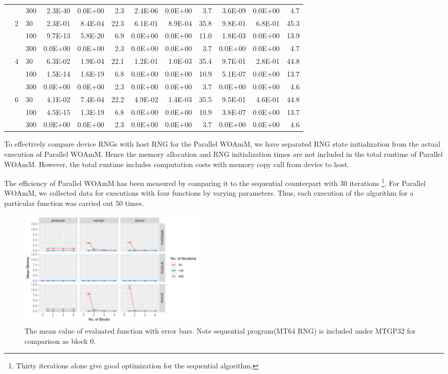 \documentclass[conference]{IEEEtran}
\begin{document}
\begin{table}[!t]
\begin{tabular}{|l|l|l|rrr|rrr|rrr|}
      & & 300  & 2.3E-40 & 0.0E+00 & 2.3 & 2.4E-06 & 0.0E+00 & 3.7 & 3.6E-09 & 0.0E+00 & 4.7\\
      \cline{2-12}
      & \multirow{3}{*}{2} & 30  & 2.3E-01 & 8.4E-04 & 22.3 & 6.1E-01 & 8.9E-04 & 35.8 & 9.8E-01 & 6.8E-01 & 45.3\\
      & & 100  & 9.7E-13 & 5.8E-20 & 6.9 & 0.0E+00 & 0.0E+00 & 11.0 & 1.8E-03 & 0.0E+00 & 13.9\\
      & & 300  & 0.0E+00 & 0.0E+00 & 2.3 & 0.0E+00 & 0.0E+00 & 3.7 & 0.0E+00 & 0.0E+00 & 4.7\\
      \cline{2-12}
      & \multirow{3}{*}{4} & 30  & 6.3E-02 & 1.9E-04 & 22.1 & 1.2E-01 & 1.0E-03 & 35.4 & 9.7E-01 & 2.8E-01 & 44.8\\
      & & 100  & 1.5E-14 & 1.6E-19 & 6.8 & 0.0E+00 & 0.0E+00 & 10.9 & 5.1E-07 & 0.0E+00 & 13.7\\
      & & 300  & 0.0E+00 & 0.0E+00 & 2.3 & 0.0E+00 & 0.0E+00 & 3.7 & 0.0E+00 & 0.0E+00 & 4.6\\
      \cline{2-12}
      & \multirow{3}{*}{6} & 30  & 4.1E-02 & 7.4E-04 & 22.2 & 4.9E-02 & 1.4E-03 & 35.5 & 9.5E-01 & 4.6E-01 & 44.8\\
      & & 100  & 4.5E-15 & 1.3E-19 & 6.8 & 0.0E+00 & 0.0E+00 & 10.9 & 3.8E-07 & 0.0E+00 & 13.7\\
      & & 300  & 0.0E+00 & 0.0E+00 & 2.3 & 0.0E+00 & 0.0E+00 & 3.7 & 0.0E+00 & 0.0E+00 & 4.6\\
      \hline
    \end{tabular}
  \end{table}


To effectively compare device RNGs with host RNG for the Parallel WOAmM, we have separated RNG state initialization from the actual execution of Parallel WOAmM. 
Hence the memory allocation and RNG initialization times are not included in the total runtime of Parallel WOAmM. 
However, the total runtime includes computation costs with memory copy call from device to host.

The efficiency of Parallel WOAmM has been measured by comparing it to the sequential counterpart with 30 iterations
\footnote{Thirty iterations alone give good optimization for the sequential algorithm.}. 
For Parallel WOAmM, we collected data for executions with four functions by varying parameters. 
Thus, each execution of the algorithm for a particular function was carried out 50 times.

\begin{figure}[ht]
    \centering
    \includegraphics[width=0.44\textwidth]{fitness}
    \caption{The mean value of evaluated function with error bars. Note sequential program(MT64 RNG) is included under MTGP32 for comparison as block 0.}
    \label{fig:fitness}
\end{figure}
\end{document}
